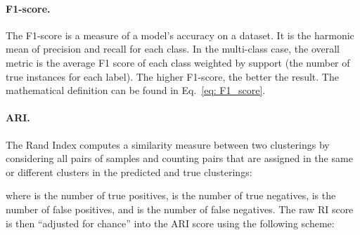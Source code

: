\documentclass[letterpaper]{article} \usepackage{aaai22}  \usepackage{times}  \usepackage{helvet}  \usepackage{courier}  \usepackage[hyphens]{url}  \usepackage{graphicx} \urlstyle{rm} \def\UrlFont{\rm}  \usepackage{natbib}  \usepackage{caption} \DeclareCaptionStyle{ruled}{labelfont=normalfont,labelsep=colon,strut=off} \frenchspacing  \setlength{\pdfpagewidth}{8.5in}  \setlength{\pdfpageheight}{11in}  \usepackage{subfigure}
\begin{document}
\begin{table}[h]
    \centering
    \caption{Important symbols used in the metric definition.}
    \label{tab:symbols_appendix}
\end{table}    


\paragraph{F1-score.} The F1-score is a measure of a model’s accuracy on a dataset. It is the harmonic mean of precision and recall for each class. In the multi-class case, the overall metric is the average F1 score of each class weighted by support (the number of true instances for each label). The higher F1-score, the better the result. The mathematical definition can be found in Eq.~\ref{eq: F1_score}.



\paragraph{ARI.} The Rand Index computes a similarity measure between two clusterings by considering all pairs of samples and counting pairs that are assigned in the same or different clusters in the predicted and true clusterings:

where  is the number of true positives,  is the number of true negatives,  is the number of false positives, and  is the number of false negatives. The raw RI score is then “adjusted for chance” into the ARI score using the following scheme:
\end{document}
